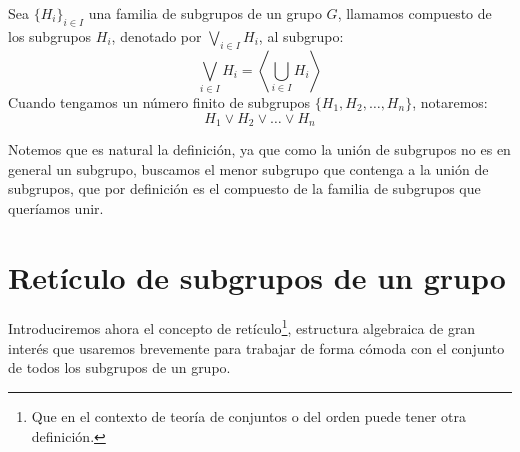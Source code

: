 \begin{definicion}[Compuesto]
    Sea $\{H_i\}_{i \in I}$ una familia de subgrupos de un grupo $G$, llamamos compuesto de los subgrupos $H_i$, denotado por $\bigvee\limits_{i \in I} H_i$, al subgrupo:
    \begin{equation*}
        \bigvee_{i \in I} H_i = \left\langle \bigcup_{i \in I} H_i \right\rangle 
    \end{equation*}
    Cuando tengamos un número finito de subgrupos $\{H_1, H_2, \ldots, H_n\}$, notaremos:
    \begin{equation*}
        H_1\lor H_2\lor \ldots \lor H_n
    \end{equation*}
\end{definicion}

Notemos que es natural la definición, ya que como la unión de subgrupos no es en general un subgrupo, buscamos el menor subgrupo que contenga a la unión de subgrupos, que por definición es el compuesto de la familia de subgrupos que queríamos unir.

\section{Retículo de subgrupos de un grupo}
Introduciremos ahora el concepto de retículo\footnote{Que en el contexto de teoría de conjuntos o del orden puede tener otra definición.}, estructura algebraica de gran interés que usaremos brevemente para trabajar de forma cómoda con el conjunto de todos los subgrupos de un grupo.

